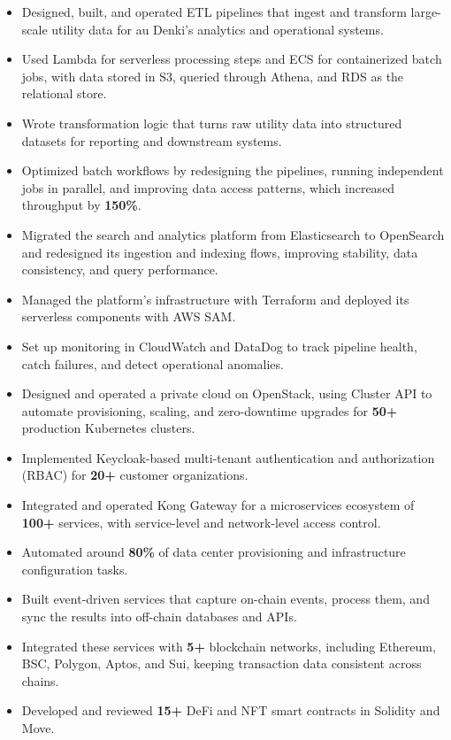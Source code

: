\begin{itemize}
    \item Designed, built, and operated ETL pipelines that ingest and transform large-scale utility data for au Denki's analytics and operational systems. %
    \item Used Lambda for serverless processing steps and ECS for containerized batch jobs, with data stored in S3, queried through Athena, and RDS as the relational store. %
    \item Wrote transformation logic that turns raw utility data into structured datasets for reporting and downstream systems. %
    \item Optimized batch workflows by redesigning the pipelines, running independent jobs in parallel, and improving data access patterns, which increased throughput by \textbf{150\%}. %
    \item Migrated the search and analytics platform from Elasticsearch to OpenSearch and redesigned its ingestion and indexing flows, improving stability, data consistency, and query performance. %
    \item Managed the platform's infrastructure with Terraform and deployed its serverless components with AWS SAM. %
    \item Set up monitoring in CloudWatch and DataDog to track pipeline health, catch failures, and detect operational anomalies. %
\end{itemize}

\jobVNPAY
\begin{itemize}
    \item Designed and operated a private cloud on OpenStack, using Cluster API to automate provisioning, scaling, and zero-downtime upgrades for \textbf{50+} production Kubernetes clusters. %
    \item Implemented Keycloak-based multi-tenant authentication and authorization (RBAC) for \textbf{20+} customer organizations. %
    \item Integrated and operated Kong Gateway for a microservices ecosystem of \textbf{100+} services, with service-level and network-level access control. %
    \item Automated around \textbf{80\%} of data center provisioning and infrastructure configuration tasks. %
\end{itemize}

\begin{itemize}
    \item Built event-driven services that capture on-chain events, process them, and sync the results into off-chain databases and APIs. %
    \item Integrated these services with \textbf{5+} blockchain networks, including Ethereum, BSC, Polygon, Aptos, and Sui, keeping transaction data consistent across chains. %
    \item Developed and reviewed \textbf{15+} DeFi and NFT smart contracts in Solidity and Move. %
\end{itemize}


